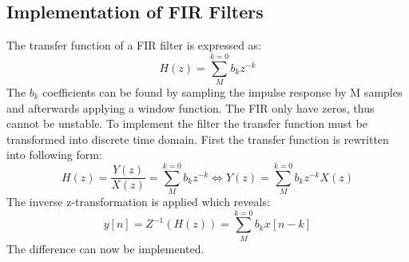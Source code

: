 \subsection*{Implementation of FIR Filters}

The transfer function of a FIR filter is expressed as:
\begin{equation}
H(z) = \sum_{M}^{k=0} b_k z^{-k}
\end{equation}
The $b_k$ coefficients can be found by sampling the impulse response by M samples and afterwards applying a window function. The FIR only have zeros, thus cannot be unstable. To implement the filter the transfer function must be transformed into discrete time domain. First the transfer function is rewritten into following form:
\begin{equation}
H(z) = \frac{Y(z)}{X(z)} = \sum_{M}^{k=0} b_k z^{-k} \Leftrightarrow Y(z) = \sum_{M}^{k=0} b_k z^{-k} X(z) 
\end{equation}
The inverse z-transformation is applied which reveals:
\begin{equation}
y[n] = Z^{-1}(H(z)) =\sum_{M}^{k=0} b_k x[n-k]
\end{equation}
The difference can now be implemented.



